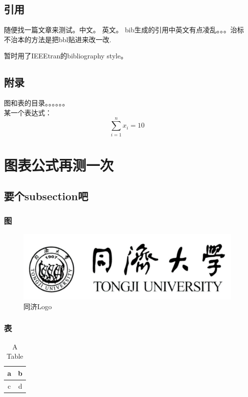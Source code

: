 	
\subsection{引用}
	随便找一篇文章来测试。中文\cite{余胜泉2000}。 英文\cite{liu2010system}。
	bib生成的引用中英文有点凌乱。。。治标不治本的方法是把bbl贴进来改一改.
	
	暂时用了IEEEtran的bibliography style。


\subsection{附录}

	图和表的目录。。。。。。\\
	某一个表达式：
	\begin{equation}
	 \sum_{i=1}^{n}x_i = 10
	\end{equation}
	




\section{图表公式再测一次}

\subsection{要个subsection吧}

\subsubsection{图}
	\begin{figure}[h!]
		\centering
		\includegraphics[width=0.5\linewidth]{tongji-logo.png}
		\caption{同济Logo}
		\label{fig:tongji2}
	\end{figure}

\subsubsection{表}
		\begin{table}[h!]
		\centering
			\caption{A Table}
			\begin{tabular}{c|c}
			a & b \\ \hline
			c & d \\ \hline
			\end{tabular}
		\end{table}
		
